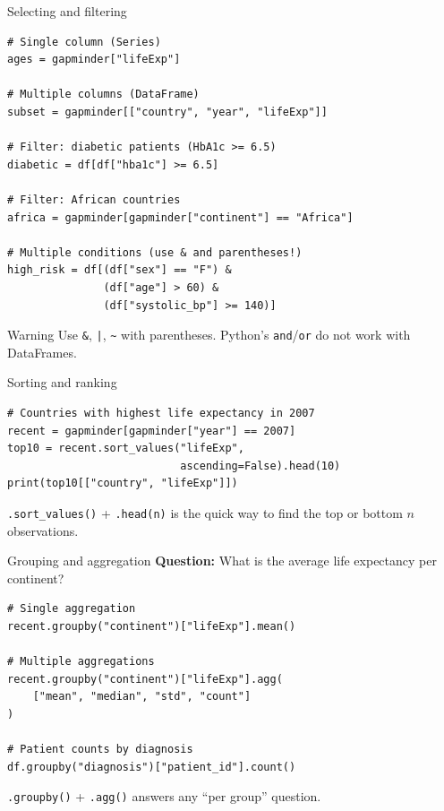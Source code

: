 \documentclass[aspectratio=169,11pt]{beamer}
\begin{document}
\begin{frame}[fragile]{Selecting and filtering}
\begin{verbatim}
# Single column (Series)
ages = gapminder["lifeExp"]

# Multiple columns (DataFrame)
subset = gapminder[["country", "year", "lifeExp"]]

# Filter: diabetic patients (HbA1c >= 6.5)
diabetic = df[df["hba1c"] >= 6.5]

# Filter: African countries
africa = gapminder[gapminder["continent"] == "Africa"]

# Multiple conditions (use & and parentheses!)
high_risk = df[(df["sex"] == "F") &
               (df["age"] > 60) &
               (df["systolic_bp"] >= 140)]
\end{verbatim}

\begin{alertblock}{Warning}
Use \texttt{\&}, \texttt{|}, \texttt{\textasciitilde} with parentheses. Python's \texttt{and}/\texttt{or} do not work with DataFrames.
\end{alertblock}
\end{frame}

\begin{frame}[fragile]{Sorting and ranking}
\begin{verbatim}
# Countries with highest life expectancy in 2007
recent = gapminder[gapminder["year"] == 2007]
top10 = recent.sort_values("lifeExp",
                           ascending=False).head(10)
print(top10[["country", "lifeExp"]])
\end{verbatim}

\vspace{6pt}
\texttt{.sort\_values()} + \texttt{.head(n)} is the quick way to find the top or bottom $n$ observations.
\end{frame}

\begin{frame}[fragile]{Grouping and aggregation}
\textbf{Question:} What is the average life expectancy per continent?

\begin{verbatim}
# Single aggregation
recent.groupby("continent")["lifeExp"].mean()

# Multiple aggregations
recent.groupby("continent")["lifeExp"].agg(
    ["mean", "median", "std", "count"]
)

# Patient counts by diagnosis
df.groupby("diagnosis")["patient_id"].count()
\end{verbatim}

\vspace{4pt}
\texttt{.groupby()} + \texttt{.agg()} answers any \alert{``per group''} question.
\end{frame}
\end{document}
